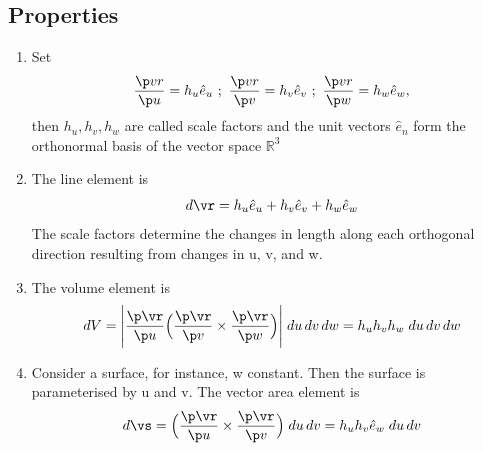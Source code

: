 \documentclass[a4paper, 11pt, normalem]{report}
\begin{document}
\subsection{Properties}
\begin{enumerate}
    \item Set
        \begin{equation*}
            \frac{\p vr}{\p u} = h_u \hat{e}_u ~;~ \frac{\p vr}{\p v} = h_v \hat{e}_v ~;~ \frac{\p vr}{\p w} = h_w \hat{e}_w,
        \end{equation*}
        then $h_u, h_v, h_w$ are called scale factors and the unit vectors $\hat{e}_n$ form the orthonormal basis of the vector space $\mathbb{R}^3$
    \item The line element is
        \begin{equation*}
            d\vr = h_u \hat{e}_u + h_v \hat{e}_v + h_w \hat{e}_w
        \end{equation*}
        The scale factors determine the changes in length along each orthogonal direction resulting from changes in u, v, and w.
    \item The volume element is
        \begin{equation*}
            dV = \Bigg|\frac{\p \vr}{\p u}\Big(\frac{\p \vr}{\p v}\times \frac{\p \vr}{\p w}\Big)\Bigg|\;du\,dv\,dw = h_u h_v h_w \; du\,dv\,dw
        \end{equation*}
    \item Consider a surface, for instance, w constant. Then the surface is parameterised by u and v. The vector area element is
        \begin{equation*}
            d\vs = \Big(\frac{\p\vr}{\p u} \times \frac{\p \vr}{\p v}\Big)\; du\, dv = h_u h_v \hat{e}_w \; du\,dv
        \end{equation*}
\end{enumerate}
\end{document}

